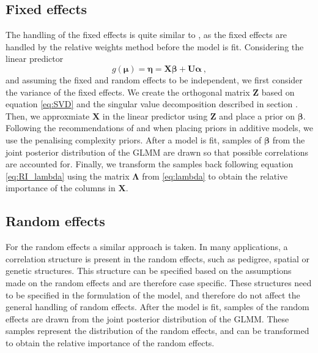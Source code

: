 \subsection{Fixed effects}
The handling of the fixed effects is quite similar to \citet{Arnstad}, as the fixed effects are handled by the relative weights method before the model is fit.
Considering the linear predictor
\begin{equation}
    g(\boldsymbol{\mu}) = \boldsymbol{\eta} = \mathbf{X}\boldsymbol{\beta} + \mathbf{U}\boldsymbol{\alpha} \ ,
\end{equation}
and assuming the fixed and random effects to be independent, we first consider the variance of the fixed effects.
We create the orthogonal matrix $\mathbf{Z}$ based on equation \eqref{eq:SVD} and the singular value decomposition described in section .
Then, we approxmiate $\mathbf{X}$ in the linear predictor using $\mathbf{Z}$ and place a prior on $\boldsymbol{\beta}$. 
Following the recommendations of \citet{simpson2017penalising} and \citet{gomezrubio2020inla} when placing priors in additive models, we use the penalising complexity priors.
After a model is fit, samples of $\boldsymbol{\beta}$ from the joint posterior distribution of the GLMM are drawn so that possible correlations are accounted for.
Finally, we transform the samples back following equation \eqref{eq:RI_lambda} using the matrix $\boldsymbol{\Lambda}$ from \eqref{eq:lambda} to obtain the relative importance of the columns in $\mathbf{X}$.

\subsection{Random effects}
For the random effects a similar approach is taken.
In many applications, a correlation structure is present in the random effects, such as pedigree, spatial or genetic structures. 
This structure can be specified based on the assumptions made on the random effects and are therefore case specific.
These structures need to be specified in the formulation of the model, and therefore do not affect the general handling of random effects.
After the model is fit, samples of the random effects are drawn from the joint posterior distribution of the GLMM. 
These samples represent the distribution of the random effects, and can be transformed to obtain the relative importance of the random effects.



